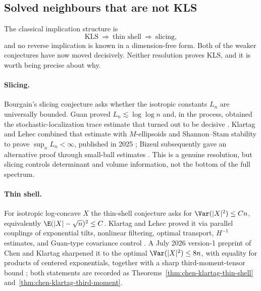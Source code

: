 \documentclass[../../main.tex]{subfiles}
\begin{document}
\subsection{Solved neighbours that are not KLS}
\label{subsec:kls-solved-neighbours}

The classical implication structure is
\begin{equation}
  \mathrm{KLS}\ \Longrightarrow\ \text{thin shell}\ \Longrightarrow\ \text{slicing},
  \label{eq:kls-implication-chain}
\end{equation}
and no reverse implication is known in a dimension-free form. Both of the weaker conjectures have
now moved decisively. Neither resolution proves KLS, and it is worth being precise about why.

\paragraph{Slicing.}
Bourgain's slicing conjecture asks whether the isotropic constants $L_n$ are universally bounded.
Guan proved $L_n\lesssim\log\log n$ and, in the process, obtained the stochastic-localization
trace estimate that turned out to be decisive \cite{Guan2024}. Klartag and Lehec combined that
estimate with $M$-ellipsoids and Shannon--Stam stability to prove $\sup_nL_n<\infty$, published in
2025 \cite{KlartagLehec2025Slicing}; Bizeul subsequently gave an alternative proof through
small-ball estimates \cite{Bizeul2025SmallBallSlicing}. This is a genuine resolution, but slicing
controls determinant and volume information, not the bottom of the full spectrum.

\paragraph{Thin shell.}
For isotropic log-concave $X$ the thin-shell conjecture asks for $\Var(|X|^2)\le Cn$, equivalently
$\E(|X|-\sqrt n)^2\le C$. Klartag and Lehec proved it via parallel couplings of exponential tilts,
nonlinear filtering, optimal transport, $H^{-1}$ estimates, and Guan-type covariance control
\cite{KlartagLehec2025ThinShell}. A July 2026 version-1 preprint of Chen and Klartag sharpened it
to the optimal $\Var(|X|^2)\le8n$, with equality for products of centered exponentials, together
with a sharp third-moment-tensor bound \cite{ChenKlartag2026SharpThinShell}; both statements are
recorded as Theorems~\ref{thm:chen-klartag-thin-shell} and~\ref{thm:chen-klartag-third-moment}.
\end{document}
